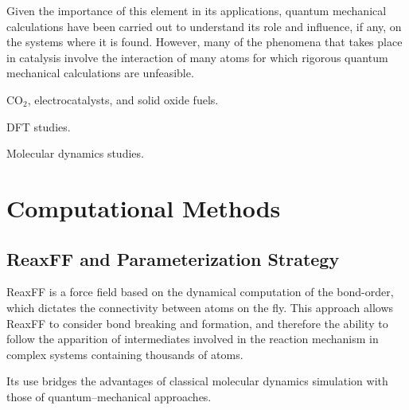 \documentclass[journal=jpcafh,manuscript=article]{achemso}
\begin{document}
Given the importance of this element in its applications, quantum mechanical calculations have been carried out to understand its role and influence, if any, on the systems where it is found.
However, many of the phenomena that takes place in catalysis involve the interaction of many atoms for which rigorous quantum mechanical calculations are unfeasible.

CO$_2$, electrocatalysts, and solid oxide fuels.\cite{
habisreutinger_photocatalytic_2013,
e.benson_electrocatalytic_2009,
pradeepindrakanti_photoinduced_2009,
indrakanti_quantum_2009,
zeng_review_2018,
yamada_systematic_2018,
kar_enhanced_2016,
grimaud_double_2013,
ni_electrochemical_2012,
tan_co_2011,
baniecki_photoemission_2008,
jia_heterogeneous_2017,
yin_oxide_2018,
zheng_review_2017,
andersson_review_2010,
beatriz_microwave-assisted_2015}

DFT studies.\cite{tian_dft_2018,
mayeshiba_strain_2017,
wang_oxidation_2006,
li_density_2013,
liu_influence_2018,
seo_design_2015,
evarestov_adsorption_2007,
pilania_establishing_2012,
pilania_adsorption_2010,
zurek_predicting_2015}

Molecular dynamics studies.\cite{wang_coarse-grained_2014}

\section{Computational Methods}

\subsection{ReaxFF and Parameterization Strategy}

ReaxFF is a force field based on the dynamical computation of the bond-order, which dictates the connectivity between atoms on the fly.
This approach allows ReaxFF to consider bond breaking and formation, and therefore the ability to follow the apparition of intermediates involved in the reaction mechanism in complex systems containing thousands of atoms.\cite{migliorati_development_2017,merinov_reaxff_2014,
raymand_reactive_2008,
shin_development_2015,
van_duin_reaxff_2008,
goddard_development_2006,
hubin_parameterization_2016,
senftle_reaxff_2016,
chenoweth_reaxff_2009,
chenoweth_reaxff_2008,
van_duin_reaxff_2008-1,
liu_reaxff-lg:_2011}

Its use bridges the advantages of classical molecular dynamics simulation with those of quantum--mechanical approaches.
\end{document}
